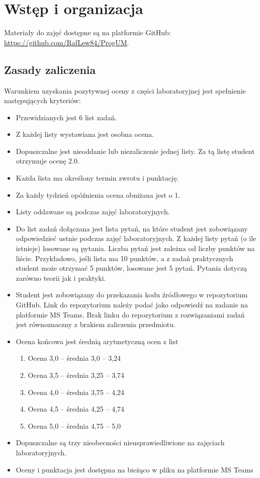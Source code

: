 \chapter*{Wstęp i organizacja}

Materiały do zajęć dostępne są na platformie GitHub: \url{https://github.com/RafLew84/ProgUM}.

\section{Zasady zaliczenia}
Warunkiem uzyskania pozytywnej oceny z części laboratoryjnej jest spełnienie następujących kryteriów:
\begin{itemize}
    \item Przewidzianych jest 6 list zadań.
    \item Z każdej listy wystawiana jest osobna ocena.
    \item Dopuszczalne jest nieoddanie lub niezaliczenie jednej listy. Za tą listę student otrzymuje ocenę 2.0.
    \item Każda lista ma określony termin zwrotu i punktację.
    \item Za każdy tydzień opóźnienia ocena obniżana jest o 1.
    \item Listy oddawane są podczas zajęć laboratoryjnych.
    \item Do list zadań dołączana jest lista pytań, na które student jest zobowiązany odpowiedzieć ustnie podczas zajęć laboratoryjnych. Z każdej listy pytań (o ile istnieje) losowane są pytania. Liczba pytań jest zależna od liczby punktów na liście. Przykładowo, jeśli lista ma 10 punktów, a z zadań praktycznych student może otrzymać 5 punktów, losowane jest 5 pytań. Pytania dotyczą zarówno teorii jak i praktyki.
    \item Student jest zobowiązany do przekazania kodu źródłowego w repozytorium GitHub. Link do repozytorium należy podać jako odpowiedź na zadanie na platformie MS Teams. Brak linku do repozytorium z rozwiązaniami zadań jest równoznaczny z brakiem zaliczenia przedmiotu.
    \item Ocena końcowa jest średnią arytmetyczną ocen z list
    \begin{enumerate}
        \item Ocena 3,0 – średnia 3,0 – 3,24
        \item Ocena 3,5 – średnia 3,25 – 3,74
        \item Ocena 4,0 – średnia 3,75 – 4,24
        \item Ocena 4,5 – średnia 4,25 – 4,74
        \item Ocena 5,0 – średnia 4,75 – 5,0
    \end{enumerate}
    \item Dopuszczalne są trzy nieobecności nieusprawiedliwione na zajęciach laboratoryjnych.
    \item Oceny i punktacja jest dostępna na bieżąco w pliku na platformie MS Teams
\end{itemize}

